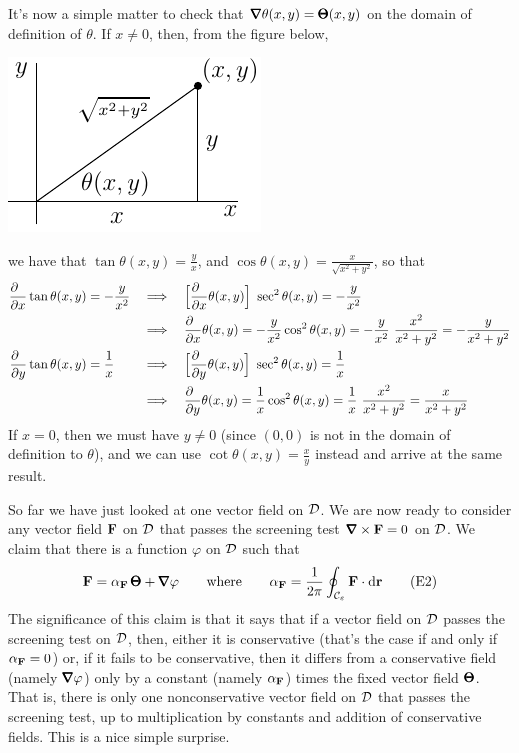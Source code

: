It's now a simple matter to check that $\vnabla\theta(x,y)=\vTh(x,y)$
on the domain of definition of $\theta$. If $x\ne 0$, then, from the
figure below,%
\begin{nfig}
\begin{center}
    \includegraphics{triangleTh}
\end{center}
\end{nfig}
we have that $\tan\theta(x,y)=\frac{y}{x}$, and
$\cos\theta(x,y) = \frac{x}{\sqrt{x^2+y^2}}$, so that
\begin{align*}
\frac{\partial\hfill}{\partial x}\tan\theta(x,y)
&=-\frac{y}{x^2} &&
&\hskip-10pt\implies&& &\Big[\frac{\partial\hfill}{\partial x}\theta(x,y)\Big]
      \ \sec^2\theta(x,y)
      =-\frac{y}{x^2}  \\
& && &\hskip-10pt\implies&& &\frac{\partial\hfill}{\partial x}\theta(x,y) 
=-\frac{y}{x^2}\cos^2\theta(x,y)
=-\frac{y}{x^2}\ \frac{x^2}{x^2+y^2}
=-\frac{y}{x^2+y^2}
 \\
\frac{\partial\hfill}{\partial y}\tan\theta(x,y)
&=\frac{1}{x} &&
&\hskip-10pt\implies&& &\Big[\frac{\partial\hfill}{\partial y}\theta(x,y)\Big]
     \ \sec^2\theta(x,y)
     =\frac{1}{x} \\
& && &\hskip-10pt\implies&& &\frac{\partial\hfill}{\partial y}\theta(x,y) 
=\frac{1}{x}\cos^2\theta(x,y)
=\frac{1}{x}\ \frac{x^2}{x^2+y^2}
=\frac{x}{x^2+y^2}
\end{align*}
If $x=0$, then we must have $y\ne 0$ (since $(0,0)$ is not in the domain of definition to $\theta$), and we can use $\cot\theta(x,y)=\frac{x}{y}$
instead and arrive at the same result.


   So far we have just looked at one vector field on $\mathcal{D}$.
We are  now ready to consider any vector field $\mathbf{F}$ on $\mathcal{D}$ that 
passes the screening test $\vnabla\times\vF=0$ on $\mathcal{D}$. We claim that 
there is a function $\varphi$ on $\mathcal{D}$ such that
\begin{equation}
\vF=\alpha_\vF\,\vTh+\vnabla\varphi\qquad\text{where}\qquad
\alpha_\vF = \frac{1}{2\pi}\oint_{\cC_\veps}\vF\cdot \dee{\vr}
\tag{E2}\end{equation}
The significance of this claim is that it says that if a vector field on
$\mathcal{D}$ passes the screening test on $\mathcal{D}$, then, either it is conservative
(that's the case if and only if $\alpha_{\mathbf{F}}=0$) or, if it fails to be 
conservative, then it differs from a conservative field (namely 
$\vnabla\varphi$) only by
a constant (namely $\alpha_{\mathbf{F}}$) times the fixed vector field ${\pmb{\Theta}}$. 
That is, there is only one nonconservative vector field on $\mathcal{D}$ that 
passes the screening test, up to multiplication by constants and addition 
of conservative fields.  This is a nice simple surprise.


